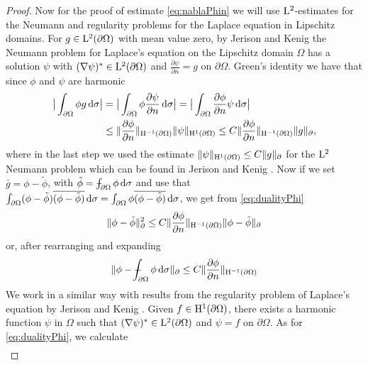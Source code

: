 \begin{proof}
  Now for the proof of estimate \eqref{eq:nablaPhin} we will use $\mathrm{L}^2$-estimates for the Neumann and regularity problems for the Laplace equation in Lipschitz domains.
  For $g \in \mathrm{L}^2(\partial\Omega)$ with mean value zero, by Jerison and Kenig \cite{jerisonKenig} the Neumann problem for Laplace's equation on the Lipschitz domain $\Omega$ has a solution $\psi$ with  $(\nabla \psi)^* \in \mathrm{L}^2(\partial\Omega)$ and $\frac{\partial \psi}{\partial n} = g$ on $\partial \Omega$.
  Green's identity we have that since $\phi$ and $\psi$ are harmonic
  \begin{align}
    \big| \int_{\partial\Omega} \phi g \, {\operatorname{d}\!{\sigma}} \big|
    &=  \big| \int_{\partial\Omega} \phi \frac{\partial \psi}{\partial n} \, {\operatorname{d}\!{\sigma}} \big|
    = \big| \int_{\partial\Omega} \frac{\partial \phi}{\partial n} \psi \, {\operatorname{d}\!{\sigma}} \big|\nonumber \\
    \label{eq:dualityPhi}
    &\leq \| \frac{\partial \phi}{\partial n} \|_{\mathrm{H}^{-1}(\partial\Omega)} \| \psi \|_{\mathrm{H}^1(\partial\Omega)} \leq C \| \frac{\partial \phi}{\partial n} \|_{\mathrm{H}^{-1}(\partial\Omega)} \| g\|_\partial ,
  \end{align}
  where in the last step we used the estimate $\|\psi\|_{\mathrm{H}^1(\partial\Omega)} \leq C \|g\|_\partial$ for the $\mathrm{L}^2$ Neumann problem which can be found in Jerison and Kenig \cite{jerisonKenig}.
  Now if we set $\bar g = \phi - \tilde \phi$, with $\tilde \phi = \dashint_{\partial\Omega} \phi \d \sigma$ and use that $\int_{\partial\Omega} (\phi - \tilde \phi) \overline{(\phi - \tilde\phi)} \, {\operatorname{d}\!{\sigma}} = \int_{\partial\Omega} \phi \overline{(\phi - \tilde\phi)} \, {\operatorname{d}\!{\sigma}}$, we get from \eqref{eq:dualityPhi}
  \begin{align*}
    \| \phi - \tilde\phi \|_\partial^2
    \leq C \|\frac{\partial\phi}{\partial n} \|_{\mathrm{H}^{-1}(\partial\Omega)} \|\phi - \tilde \phi\|_\partial
  \end{align*}
  or, after rearranging and expanding
  \begin{align*}
    \| \phi - \dashint_{\partial\Omega} \phi \d\sigma \|_\partial \leq C \|\frac{\partial\phi}{\partial n} \|_{\HH^{-1}(\partial\Omega)}
  \end{align*}
  We work in a similar way with results from the regularity problem of Laplace's equation by Jerison and Kenig \cite{jerisonKenig2}.
  Given $f \in \mathrm{H}^1(\partial\Omega)$, there exists a harmonic function $\psi$ in $\Omega$ such that $(\nabla\psi)^* \in \mathrm{L}^2(\partial\Omega)$ and $\psi = f$ on $\partial\Omega$.
  As for \eqref{eq:dualityPhi}, we calculate
  \begin{align*}

\end{align*}
\end{proof}
